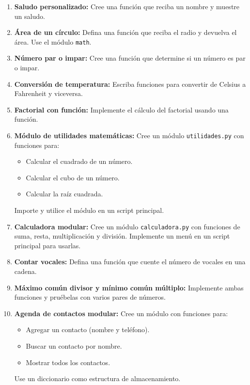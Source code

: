 \documentclass[12pt,a4paper]{article}
\begin{document}
\begin{enumerate}[label=\textbf{Ejercicio \arabic*:}, leftmargin=1.5cm]
    \item \textbf{Saludo personalizado:} Cree una función que reciba un nombre y muestre un saludo.
    
    \item \textbf{Área de un círculo:} Defina una función que reciba el radio y devuelva el área. Use el módulo \texttt{math}.
    
    \item \textbf{Número par o impar:} Cree una función que determine si un número es par o impar.
    
    \item \textbf{Conversión de temperatura:} Escriba funciones para convertir de Celsius a Fahrenheit y viceversa.
    
    \item \textbf{Factorial con función:} Implemente el cálculo del factorial usando una función.
    
    \item \textbf{Módulo de utilidades matemáticas:} Cree un módulo \texttt{utilidades.py} con funciones para:
    \begin{itemize}
        \item Calcular el cuadrado de un número.
        \item Calcular el cubo de un número.
        \item Calcular la raíz cuadrada.
    \end{itemize}
    Importe y utilice el módulo en un script principal.
    
    \item \textbf{Calculadora modular:} Cree un módulo \texttt{calculadora.py} con funciones de suma, resta, multiplicación y división. Implemente un menú en un script principal para usarlas.
    
    \item \textbf{Contar vocales:} Defina una función que cuente el número de vocales en una cadena.
    
    \item \textbf{Máximo común divisor y mínimo común múltiplo:} Implemente ambas funciones y pruébelas con varios pares de números.
    
    \item \textbf{Agenda de contactos modular:} Cree un módulo con funciones para:
    \begin{itemize}
        \item Agregar un contacto (nombre y teléfono).
        \item Buscar un contacto por nombre.
        \item Mostrar todos los contactos.
    \end{itemize}
    Use un diccionario como estructura de almacenamiento.
\end{enumerate}
\end{document}
